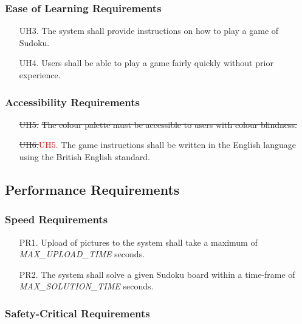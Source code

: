 \documentclass[11pt]{article}
\begin{document}
\subsubsection{Ease of Learning Requirements}
\begin{enumerate}
    \item [UH3.] The system shall provide instructions on how to play a game of Sudoku.
    
    \item [UH4.] Users shall be able to play a game fairly quickly without prior experience.
\end{enumerate}

\subsubsection{Accessibility Requirements}

\begin{enumerate}
    \item [\sout{UH5.}] \sout{The colour palette must be accessible to users with colour blindness.}
    
    \item [\sout{UH6.}\textcolor{red}{UH5.}] The game instructions shall be written in the English language using the British English standard.
\end{enumerate}

\subsection{Performance Requirements}

\subsubsection{Speed Requirements}

\begin{enumerate}
    \item [PR1.] Upload of pictures to the system shall take a maximum of \emph{MAX\_UPLOAD\_TIME} seconds. %
    \item [PR2.] The system shall solve a given Sudoku board within a time-frame of \emph{MAX\_SOLUTION\_TIME} seconds. %
\end{enumerate}

\subsubsection{Safety-Critical Requirements}
\end{document}
